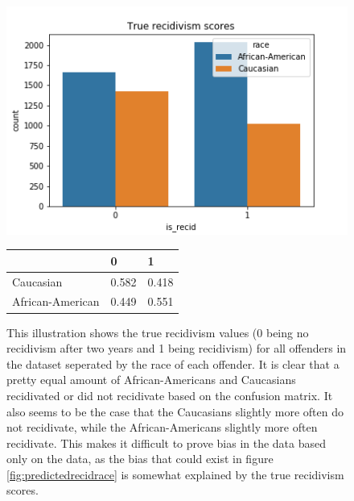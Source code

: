 \documentclass[11pt, fleqn, titlepage]{article}
\begin{document}
	
	\begin{figure}[H]
		\centering
		\includegraphics[width=0.5\linewidth]{imgs/true_recid}
		\begin{table}[H]
			\centering
			\begin{tabular}{|l|l|l|}
				\hline
				& 0   & 1  \\ \hline
				Caucasian        & 0.582 & 0.418  \\ \hline
				African-American & 0.449 & 0.551  \\ \hline
			\end{tabular}
		\end{table}
		\caption{This illustration shows the true recidivism values (0 being no recidivism after two years and 1 being recidivism) for all offenders in the dataset seperated by the race of each offender. It is clear that a pretty equal amount of African-Americans and Caucasians recidivated or did not recidivate based on the confusion matrix. It also seems to be the case that the Caucasians slightly more often do not recidivate, while the African-Americans slightly more often recidivate. This makes it difficult to prove bias in the data based only on the data, as the bias that could exist in figure \ref{fig:predictedrecidrace} is somewhat explained by the true recidivism scores.}
		\label{fig:truerecid}
	\end{figure}
	
\end{document}
